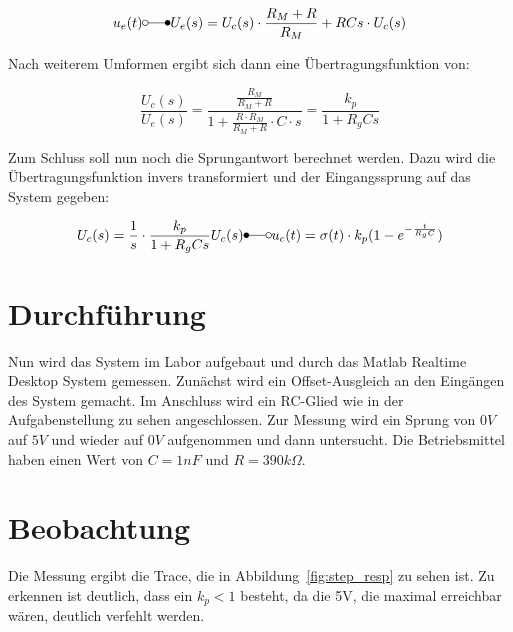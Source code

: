 \documentclass{report}
\begin{document}
\begin{equation}
  u_e(t) \laplace U_e(s) = U_c(s) \cdot \frac{R_M+R}{R_M} + RCs\cdot U_c(s)
  \label{eq:laplace}
\end{equation}

Nach weiterem Umformen ergibt sich dann eine Übertragungsfunktion von: 

\begin{equation}
  \frac{U_c(s)}{U_e(s)} = \displaystyle\frac{\frac{R_M}{R_M+R}}{1+\frac{R\cdot R_M}{R_M + R}\cdot C \cdot s} = \frac{k_p}{1+R_gCs} 
  \label{eq:ueber}
\end{equation}

Zum Schluss soll nun noch die Sprungantwort berechnet werden. Dazu wird die Übertragungsfunktion invers transformiert und der Eingangssprung auf das System gegeben:

\begin{equation}
  U_c(s) = \frac{1}{s}\cdot\frac{k_p}{1+R_gCs}\\
  U_c(s)  \Laplace  u_c(t) = \sigma(t) \cdot k_p(1-e^{-\frac{t}{R_gC}})
  \label{eq:step_resp}
\end{equation}


\section{Durchführung}

Nun wird das System im Labor aufgebaut und durch das Matlab Realtime Desktop System gemessen. Zunächst wird ein Offset-Ausgleich an den Eingängen des System gemacht. Im Anschluss wird ein RC-Glied wie in der Aufgabenstellung zu sehen angeschlossen. Zur Messung wird ein Sprung von $0V$ auf $5V$ und wieder auf $0V$ aufgenommen und dann untersucht. Die Betriebsmittel haben einen Wert von $C = 1nF$ und $R = 390k\Omega$.

\section{Beobachtung}

Die Messung ergibt die Trace, die in Abbildung~\ref{fig:step_resp} zu sehen ist. Zu erkennen ist deutlich, dass ein $k_p < 1$ besteht, da die 5V, die maximal erreichbar wären, deutlich verfehlt werden. 
\end{document}
